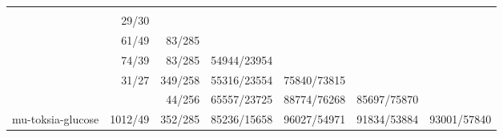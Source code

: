 \begin{tabular}{lrrrrr}
\toprule
{} &    &    &        &        &        &        \\
\midrule
{}            &          &          &              &              &              &              \\
            &    29/30 &          &              &              &              &              \\
            &    61/49 &   83/285 &              &              &              &              \\
            &    74/39 &   83/285 &  54944/23954 &              &              &              \\
            &    31/27 &  349/258 &  55316/23554 &  75840/73815 &              &              \\
            &          &   44/256 &  65557/23725 &  88774/76268 &  85697/75870 &              \\
mu-toksia-glucose &  1012/49 &  352/285 &  85236/15658 &  96027/54971 &  91834/53884 &  93001/57840 \\
\bottomrule
\end{tabular}
